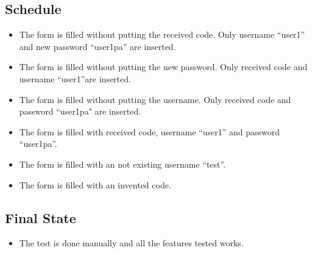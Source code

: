 \documentclass{article}
\begin{document}
\subsection{Schedule}
\begin{itemize}
    \item The form is filled without putting the received code. Only username “user1” and new password “user1pa” are inserted.
    \item The form is filled without putting the new password. Only received code and username “user1”are inserted.
    \item The form is filled without putting the username. Only received code and password “user1pa" are inserted.
    \item The form is filled with received code, username “user1” and password “user1pa”.
    \item The form is filled with an not existing username “test”.
    \item The form is filled with an invented code.
\end{itemize}
\subsection{Final State}
\begin{itemize}
    \item The test is done manually and all the features tested works.
\end{itemize}
\end{document}
